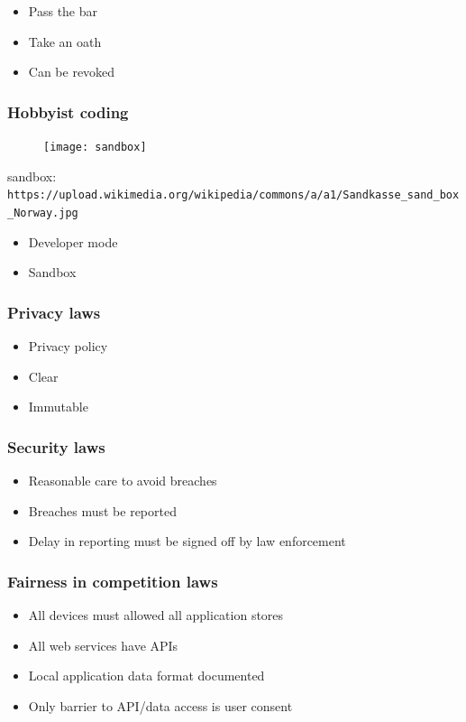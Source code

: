 \begin{itemize}
\item Pass the bar
\item Take an oath
\item Can be revoked
\end{itemize}

\begin{frame}[fragile]
\frametitle{Hobbyist coding}

\begin{figure}
\texttt{[image: sandbox]}
\end{figure}

\end{frame}

sandbox: \verb|https://upload.wikimedia.org/wikipedia/commons/a/a1/Sandkasse_sand_box_Norway.jpg|

\begin{itemize}
\item Developer mode
\item Sandbox
\end{itemize}



\begin{frame}[fragile]
\frametitle{Privacy laws}

\end{frame}

\begin{itemize}
\item Privacy policy
\item Clear
\item Immutable
\end{itemize}


\begin{frame}[fragile]
\frametitle{Security laws}


\end{frame}

\begin{itemize}
\item Reasonable care to avoid breaches
\item Breaches must be reported
\item Delay in reporting must be signed off by law enforcement
\end{itemize}

\begin{frame}[fragile]
\frametitle{Fairness in competition laws}

\end{frame}

\begin{itemize}
\item All devices must allowed all application stores
\item All web services have APIs
\item Local application data format documented
\item Only barrier to API/data access is user consent
\end{itemize}


